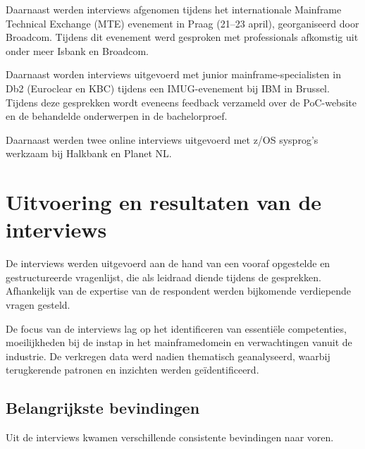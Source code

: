Daarnaast werden interviews afgenomen tijdens het internationale Mainframe Technical Exchange (MTE) evenement in Praag (21–23 april), georganiseerd door Broadcom. Tijdens dit evenement werd gesproken met professionals afkomstig uit onder meer Isbank en Broadcom.

Daarnaast worden interviews uitgevoerd met junior mainframe-specialisten in Db2 (Euroclear en KBC) tijdens een IMUG-evenement bij IBM in Brussel. Tijdens deze gesprekken wordt eveneens feedback verzameld over de PoC-website en de behandelde onderwerpen in de bachelorproef.

Daarnaast werden twee online interviews uitgevoerd met z/OS sysprog's werkzaam bij Halkbank en Planet NL.

\section{Uitvoering en resultaten van de interviews}
\label{sec:onderzoek-interview-prof-opvolging}

De interviews werden uitgevoerd aan de hand van een vooraf opgestelde en gestructureerde vragenlijst, die als leidraad diende tijdens de gesprekken. Afhankelijk van de expertise van de respondent werden bijkomende verdiepende vragen gesteld. 

De focus van de interviews lag op het identificeren van essentiële competenties, moeilijkheden bij de instap in het mainframedomein en verwachtingen vanuit de industrie. De verkregen data werd nadien thematisch geanalyseerd, waarbij terugkerende patronen en inzichten werden geïdentificeerd.

\subsection{Belangrijkste bevindingen}
\label{sec:aanpassingen-bevindingen}
Uit de interviews kwamen verschillende consistente bevindingen naar voren.

